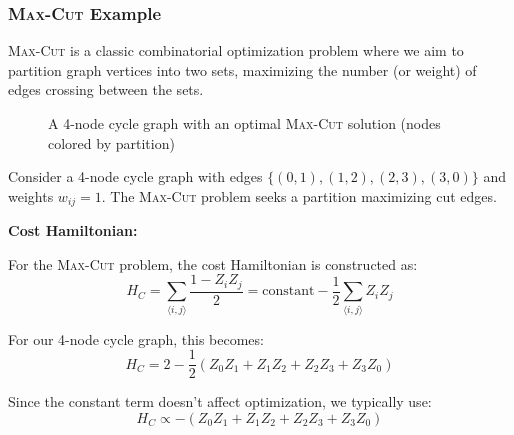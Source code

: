 \subsubsection*{\textsc{Max-Cut} Example}

\textsc{Max-Cut} is a classic combinatorial optimization problem where we aim
to partition graph vertices into two sets, maximizing the number (or weight)
of edges crossing between the sets.

\begin{figure}[H]
  \centering
  \caption{A 4-node cycle graph with an optimal \textsc{Max-Cut} solution (nodes
  colored by partition)}
  \label{fig:max-cut-example}
\end{figure}

Consider a 4-node cycle graph with edges $\{(0,1), (1,2), (2,3), (3,0)\}$ and
weights $w_{ij} = 1$. The \textsc{Max-Cut} problem seeks a partition maximizing cut
edges.

\vspace{0.3cm}

\noindent
\textbf{Cost Hamiltonian:}

\vspace{0.3cm}

For the \textsc{Max-Cut} problem, the cost Hamiltonian is constructed as:
\[
  H_C = \sum_{\langle i,j \rangle} \frac{1 - Z_i Z_j}{2} = \text{constant} -
  \frac{1}{2}\sum_{\langle i,j \rangle} Z_i Z_j
\]

For our 4-node cycle graph, this becomes:
\[
  H_C = 2 - \frac{1}{2}(Z_0 Z_1 + Z_1 Z_2 + Z_2 Z_3 + Z_3 Z_0)
\]

Since the constant term doesn't affect optimization, we typically use:
\[
  H_C \propto -(Z_0 Z_1 + Z_1 Z_2 + Z_2 Z_3 + Z_3 Z_0)
\]

